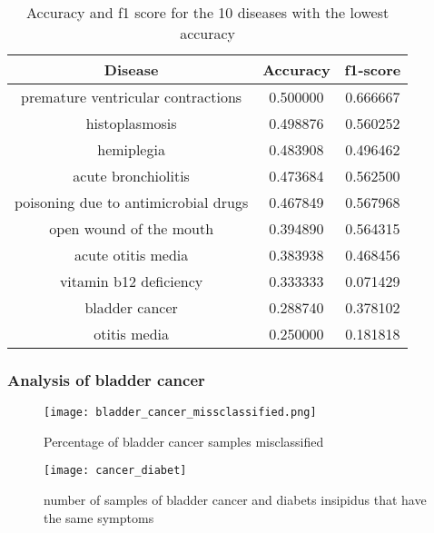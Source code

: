 \begin{table}[H]
	\centering
	\small
	\begin{tabular}{|c|c|c|}
		\hline
		\textbf{Disease}                     & \textbf{Accuracy} & \textbf{f1-score} \\
		\hline
		premature ventricular contractions   & 0.500000          & 0.666667          \\
		histoplasmosis                       & 0.498876          & 0.560252          \\
		hemiplegia                           & 0.483908          & 0.496462          \\
		acute bronchiolitis                  & 0.473684          & 0.562500          \\
		poisoning due to antimicrobial drugs & 0.467849          & 0.567968          \\
		open wound of the mouth              & 0.394890          & 0.564315          \\
		acute otitis media                   & 0.383938          & 0.468456          \\
		vitamin b12 deficiency               & 0.333333          & 0.071429          \\
		bladder cancer                       & 0.288740          & 0.378102          \\
		otitis media                         & 0.250000          & 0.181818          \\
		\hline
	\end{tabular}
	\caption{Accuracy and f1 score for the 10 diseases with the lowest accuracy}
	\label{worst}
\end{table}

\subsubsection*{Analysis of bladder cancer}

\begin{figure}[H]
	\centering
	\texttt{[image: bladder\_cancer\_missclassified.png]}
	\caption{Percentage of bladder cancer samples misclassified}\label{fig:cancer_missclassified}
\end{figure}
\noindent

\begin{figure}[H]
	\centering
	\texttt{[image: cancer\_diabet]}
	\caption{number of samples of bladder cancer and diabets insipidus that have the same symptoms}\label{fig:cancer_diabet}
\end{figure}
\noindent

